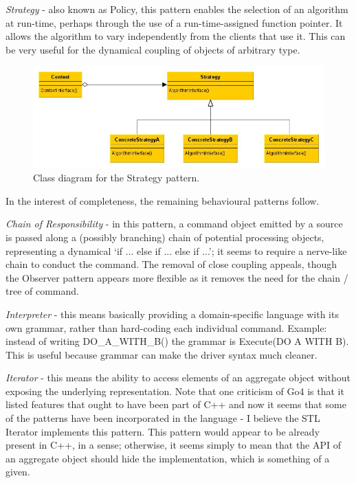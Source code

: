 {\it Strategy} - also known as Policy, this pattern enables the selection of an algorithm at run-time, perhaps through the use of a run-time-assigned function pointer.
It allows the algorithm to vary independently from the clients that use it.
This can be very useful for the dynamical coupling of objects of arbitrary type.

\begin{figure}
\begin{centering}
\includegraphics[width=12cm]{../png/strategy.jpg}
\end{centering}
\caption{Class diagram for the Strategy pattern.\label{fig:strategy}}
\end{figure}

In the interest of completeness, the remaining behavioural patterns follow.

{\it Chain of Responsibility} - in this pattern, a command object emitted by a source is passed along a (possibly branching) chain of potential processing objects, representing a dynamical `if ... else if ... else if ...'; it seems to require a nerve-like chain to conduct the command.
The removal of close coupling appeals, though the Observer pattern appears more flexible as it removes the need for the chain / tree of command.

{\it Interpreter} - this means basically providing a domain-specific language with its own grammar, rather than hard-coding each individual command.
Example: instead of writing DO\_A\_WITH\_B() the grammar is Execute(DO A WITH B).
This is useful because grammar can make the driver syntax much cleaner.

{\it Iterator} - this means the ability to access elements of an aggregate object without exposing the underlying representation.
Note that one criticism of Go4 is that it listed features that ought to have been part of C++ and now it seems that some of the patterns have been incorporated in the language - I believe the STL Iterator implements this pattern.
This pattern would appear to be already present in C++, in a sense; otherwise, it seems simply to mean that the API of an aggregate object should hide the implementation, which is something of a given.


